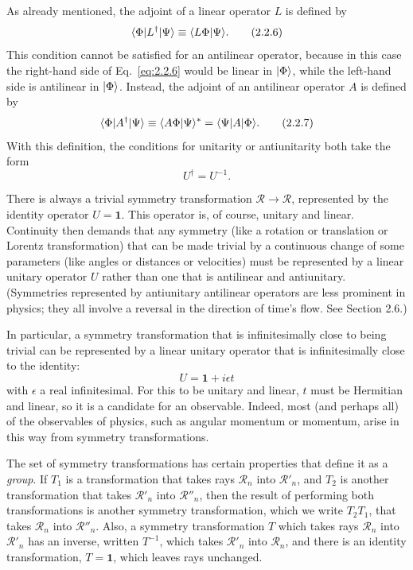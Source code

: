 As already mentioned, the adjoint of a linear operator $L$ is defined by
\begin{equation}
  \langle \Phi\rvert L^{\dagger}\lvert \Psi\rangle
    \equiv \langle L\Phi | \Psi\rangle.
  \tag{2.2.6}\label{eq:2.2.6}
\end{equation}
This condition cannot be satisfied for an antilinear operator, because in
this case the right-hand side of Eq.~\eqref{eq:2.2.6} would be linear in
$\lvert \Phi\rangle$, while the left-hand side is antilinear in $\lvert \Phi\rangle$.
Instead, the adjoint of an antilinear operator $A$ is defined by
\begin{equation}
  \langle \Phi\rvert A^{\dagger}\lvert \Psi\rangle
    \equiv \langle A\Phi | \Psi\rangle^{*}
    =\langle \Psi\rvert A\lvert \Phi\rangle.
  \tag{2.2.7}\label{eq:2.2.7}
\end{equation}
With this definition, the conditions for unitarity or antiunitarity both
take the form
\begin{equation}
  U^{\dagger}=U^{-1}.
  \tag{2.2.8}\label{eq:2.2.8}
\end{equation}

There is always a trivial symmetry transformation
$\mathcal{R}\to\mathcal{R}$, represented by the identity operator
$U=\mathbf{1}$. This operator is, of course, unitary and linear. Continuity
then demands that any symmetry (like a rotation or translation or Lorentz
transformation) that can be made trivial by a continuous change of some
parameters (like angles or distances or velocities) must be represented
by a linear unitary operator $U$ rather than one that is antilinear and
antiunitary. (Symmetries represented by antiunitary antilinear operators
are less prominent in physics; they all involve a reversal in the direction
of time's flow. See Section 2.6.)

In particular, a symmetry transformation that is infinitesimally close
to being trivial can be represented by a linear unitary operator that is
infinitesimally close to the identity:
\begin{equation}
  U=\mathbf{1}+i\epsilon t
  \tag{2.2.9}\label{eq:2.2.9}
\end{equation}
with $\epsilon$ a real infinitesimal. For this to be unitary and linear,
$t$ must be Hermitian and linear, so it is a candidate for an observable.
Indeed, most (and perhaps all) of the observables of physics, such as
angular momentum or momentum, arise in this way from symmetry
transformations.

The set of symmetry transformations has certain properties that define
it as a \emph{group}. If $T_1$ is a transformation that takes rays
$\mathcal{R}_n$ into $\mathcal{R}'_n$, and $T_2$ is another transformation
that takes $\mathcal{R}'_n$ into $\mathcal{R}''_n$, then the result of
performing both transformations is another symmetry transformation,
which we write $T_2T_1$, that takes $\mathcal{R}_n$ into
$\mathcal{R}''_n$. Also, a symmetry transformation $T$ which takes rays
$\mathcal{R}_n$ into $\mathcal{R}'_n$ has an inverse, written $T^{-1}$,
which takes $\mathcal{R}'_n$ into $\mathcal{R}_n$, and there is an identity
transformation, $T=\mathbf{1}$, which leaves rays unchanged.

